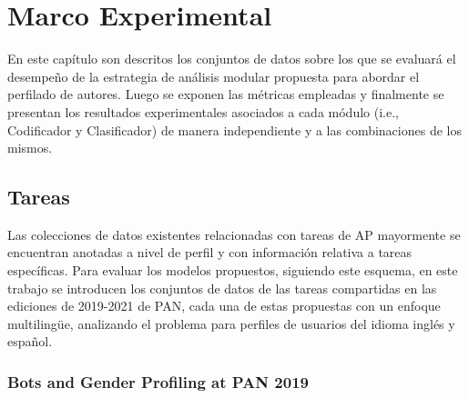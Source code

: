 \chapter{Marco Experimental}


En este capítulo son descritos los conjuntos de datos sobre los que se evaluará el desempeño de la estrategia de análisis modular propuesta para abordar el perfilado de autores. Luego se exponen las métricas empleadas y finalmente se presentan los resultados experimentales asociados a cada módulo (i.e., Codificador y Clasificador) de manera independiente y a las combinaciones de los mismos.
	
\section{Tareas}
	 
	 Las colecciones de datos existentes relacionadas con tareas de AP mayormente se encuentran anotadas a nivel de perfil y con información relativa a tareas específicas. Para evaluar los modelos propuestos, siguiendo este esquema, en este trabajo se introducen los conjuntos de datos de las tareas compartidas en las ediciones de 2019-2021 de PAN, cada una de estas propuestas con un enfoque multilingüe, analizando el problema para perfiles de usuarios del idioma inglés y español.
	 
	 \subsection{Bots and Gender Profiling at PAN 2019}
	 
